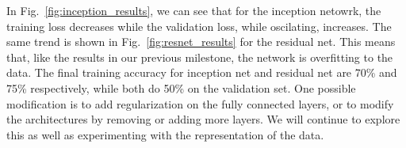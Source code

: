 \documentclass[letterpaper, 10 pt, conference]{../ieeeconf}
\newcommand{\figref}[1]{Fig.~\ref{#1}} %
\begin{document}
In \figref{fig:inception_results}, we can see that for the inception netowrk, the training loss decreases while the validation loss, while oscilating, increases. 
The same trend is shown in \figref{fig:resnet_results} for the residual net. 
This means that, like the results in our previous milestone, the network is overfitting to the data. 
The final training accuracy for inception net and residual net are 70\% and 75\% respectively, while both do 50\% on the validation set. 
One possible modification is to add regularization on the fully connected layers, or to modify the architectures by removing or adding more layers. 
We will continue to explore this as well as experimenting with the representation of the data.

    

{\footnotesize
    
}
\end{document}
